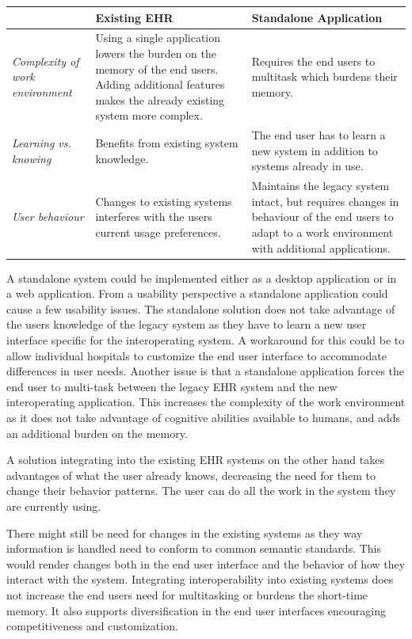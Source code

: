 \documentclass[14pt]{article}
\begin{document}
\begin{center}
	\begin{tabular} { | l | p{4.5cm} | p{4.5cm} |}
	\hline
	& Existing EHR & Standalone Application \\ \hline
	\emph{Complexity of work environment} & Using a single application lowers the burden on the memory of the end users. Adding additional features makes the already existing system more complex. & Requires the end users to multitask which burdens their memory. \\ \hline
	\emph{Learning vs. knowing} & Benefits from existing system knowledge. & The end user has to learn a new system in addition to systems already in use. \\ \hline
	\emph{User behaviour} & Changes to existing systems interferes with the users current usage preferences. & Maintains the legacy system intact, but requires changes in behaviour of the end users to adapt to a work environment with additional applications. \\ 
	\hline
	\end{tabular}
\end{center}

A standalone system could be implemented either as a desktop application or in a web application. From a usability perspective a standalone application could cause a few usability issues. The standalone solution does not take advantage of the users knowledge of the legacy system as they have to learn a new user interface specific for the interoperating system. A workaround for this could be to allow individual hospitals to customize the end user interface to accommodate differences in user needs. 
Another issue is that a standalone application forces the end user to multi-task between the legacy EHR system and the new interoperating application. This increases the complexity of the work environment as it does not take advantage of cognitive abilities available to humans, and adds an additional burden on the memory. 

A solution integrating into the existing EHR systems on the other hand takes advantages of what the user already knows, decreasing the need for them to change their behavior patterns. The user can do all the work in the system they are currently using.

There might still be need for changes in the existing systems as they way information is handled need to conform to common semantic standards. This would render changes both in the end user interface and the behavior of how they interact with the system. Integrating interoperability into existing systems does not increase the end users need for multitasking or burdens the short-time memory. It also supports diversification in the end user interfaces encouraging competitiveness and customization.
\end{document}
